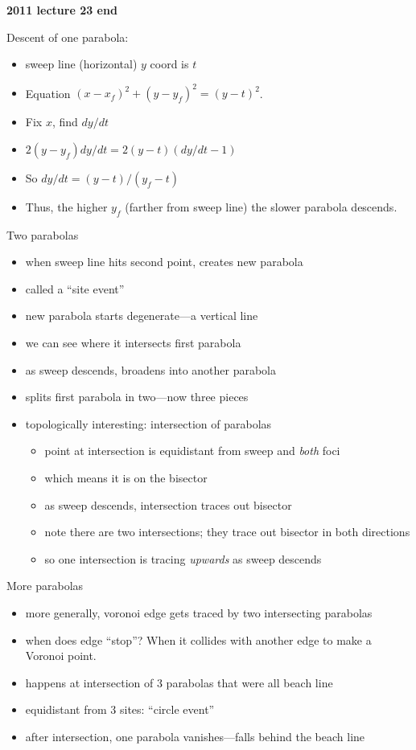 \documentclass{article}
\begin{document}
\textbf{ 2011 lecture 23 end}

Descent of one parabola:
\begin{itemize}
\item sweep line (horizontal) $y$ coord is $t$
\item Equation $(x-x_f)^2+(y-y_f)^2 = (y-t)^2$.
\item Fix $x$, find $dy/dt$
\item $2(y-y_f)dy/dt = 2(y-t)(dy/dt-1)$
\item So $dy/dt=(y-t)/(y_f-t)$
\item Thus, the higher $y_f$ (farther from sweep line) the slower
  parabola descends.
\end{itemize}

Two parabolas
\begin{itemize}
\item when sweep line hits second point, creates new parabola
\item called a ``site event''
\item new parabola starts degenerate---a vertical line
\item we can see where it intersects first parabola
\item as sweep descends, broadens into another parabola
\item splits first parabola in two---now three pieces
\item topologically interesting: intersection of parabolas
\begin{itemize}
\item point at intersection is equidistant from sweep and \emph{both}
  foci
\item which means it is on the bisector
\item as sweep descends, intersection traces out bisector
\item note there are two intersections; they trace out bisector in
  both directions
\item so one intersection is tracing \emph{upwards} as sweep descends
\end{itemize}
\end{itemize}

More parabolas
\begin{itemize}
\item more generally, voronoi edge gets traced by two intersecting parabolas
\item when does edge ``stop''?  When it collides with another edge to
  make a Voronoi point.
\item happens at intersection of 3 parabolas that were all beach line
\item equidistant from 3 sites: ``circle event''
\item after intersection, one parabola vanishes---falls behind the
  beach line
\end{itemize}
\end{document}
